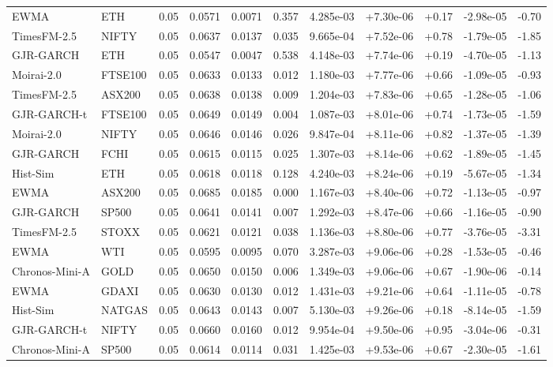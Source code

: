 \begin{tabular}{llrrrrrrrrr}
EWMA & ETH & 0.05 & 0.0571 & 0.0071 & 0.357 & 4.285e-03 & +7.30e-06 & +0.17 & -2.98e-05 & -0.70 \\
TimesFM-2.5 & NIFTY & 0.05 & 0.0637 & 0.0137 & 0.035 & 9.665e-04 & +7.52e-06 & +0.78 & -1.79e-05 & -1.85 \\
GJR-GARCH & ETH & 0.05 & 0.0547 & 0.0047 & 0.538 & 4.148e-03 & +7.74e-06 & +0.19 & -4.70e-05 & -1.13 \\
Moirai-2.0 & FTSE100 & 0.05 & 0.0633 & 0.0133 & 0.012 & 1.180e-03 & +7.77e-06 & +0.66 & -1.09e-05 & -0.93 \\
TimesFM-2.5 & ASX200 & 0.05 & 0.0638 & 0.0138 & 0.009 & 1.204e-03 & +7.83e-06 & +0.65 & -1.28e-05 & -1.06 \\
GJR-GARCH-t & FTSE100 & 0.05 & 0.0649 & 0.0149 & 0.004 & 1.087e-03 & +8.01e-06 & +0.74 & -1.73e-05 & -1.59 \\
Moirai-2.0 & NIFTY & 0.05 & 0.0646 & 0.0146 & 0.026 & 9.847e-04 & +8.11e-06 & +0.82 & -1.37e-05 & -1.39 \\
GJR-GARCH & FCHI & 0.05 & 0.0615 & 0.0115 & 0.025 & 1.307e-03 & +8.14e-06 & +0.62 & -1.89e-05 & -1.45 \\
Hist-Sim & ETH & 0.05 & 0.0618 & 0.0118 & 0.128 & 4.240e-03 & +8.24e-06 & +0.19 & -5.67e-05 & -1.34 \\
EWMA & ASX200 & 0.05 & 0.0685 & 0.0185 & 0.000 & 1.167e-03 & +8.40e-06 & +0.72 & -1.13e-05 & -0.97 \\
GJR-GARCH & SP500 & 0.05 & 0.0641 & 0.0141 & 0.007 & 1.292e-03 & +8.47e-06 & +0.66 & -1.16e-05 & -0.90 \\
TimesFM-2.5 & STOXX & 0.05 & 0.0621 & 0.0121 & 0.038 & 1.136e-03 & +8.80e-06 & +0.77 & -3.76e-05 & -3.31 \\
EWMA & WTI & 0.05 & 0.0595 & 0.0095 & 0.070 & 3.287e-03 & +9.06e-06 & +0.28 & -1.53e-05 & -0.46 \\
Chronos-Mini-A & GOLD & 0.05 & 0.0650 & 0.0150 & 0.006 & 1.349e-03 & +9.06e-06 & +0.67 & -1.90e-06 & -0.14 \\
EWMA & GDAXI & 0.05 & 0.0630 & 0.0130 & 0.012 & 1.431e-03 & +9.21e-06 & +0.64 & -1.11e-05 & -0.78 \\
Hist-Sim & NATGAS & 0.05 & 0.0643 & 0.0143 & 0.007 & 5.130e-03 & +9.26e-06 & +0.18 & -8.14e-05 & -1.59 \\
GJR-GARCH-t & NIFTY & 0.05 & 0.0660 & 0.0160 & 0.012 & 9.954e-04 & +9.50e-06 & +0.95 & -3.04e-06 & -0.31 \\
Chronos-Mini-A & SP500 & 0.05 & 0.0614 & 0.0114 & 0.031 & 1.425e-03 & +9.53e-06 & +0.67 & -2.30e-05 & -1.61 \\

\end{tabular}
